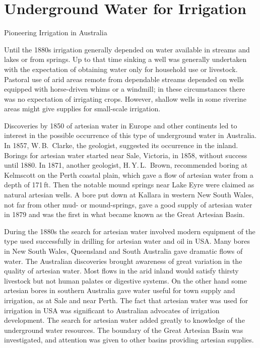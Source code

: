 
\setcounter{endnote}{0}

\chapter{Underground Water for Irrigation}
\label{ch:underground}
%
{Pioneering Irrigation in Australia}

Until the 1880s irrigation generally depended on water available in
streams and lakes or from springs.  Up to that time sinking a well was
generally undertaken with the expectation of obtaining water only for
household use or livestock.  Pastoral use of arid areas remote from
dependable streams depended on wells equipped with horse-driven whims
or a windmill; in these circumstances there was no expectation of
irrigating crops.  However, shallow wells in some riverine areas might
give supplies for small-scale irrigation.

Discoveries by 1850 of artesian water in Europe and other continents
led to interest in the possible occurrence of this type of underground
water in Australia.  In 1857, W.\,B.~Clarke, the geologist, suggested
its occurrence in the inland. Borings for artesian water started near
Sale, Victoria, in 1858, without success until 1880.  In 1871, another
geologist, H.\,Y.\,L.~Brown, recommended boring at Kelmscott on the
Perth coastal plain, which gave a flow of artesian water from a depth
of 171\,ft.  Then the notable mound springs near Lake Eyre were
claimed as natural artesian wells. A bore put down at Kallara in
western New South Wales, not far from other mud- or mound-springs,
gave a good supply of artesian water in 1879 and was the first in what
became known as the Great Artesian
Basin.

During the 1880s the search for artesian water involved modern
equipment of the type used successfully in drilling for artesian water
and oil in USA.  Many bores in New South Wales, Queensland and South
Australia gave dramatic flows of water.  The Australian discoveries
brought awareness of great variation in the quality of artesian water.
Most flows in the arid inland would satisfy thirsty livestock but not
human palates or digestive systems.  On the other hand some artesian
bores in southern Australia gave water useful for town supply and
irrigation, as at Sale and near Perth.  The fact that artesian water
was used for irrigation in USA was significant to Australian advocates
of irrigation development.  The search for artesian water added
greatly to knowledge of the underground water resources.  The boundary
of the Great Artesian Basin was investigated, and attention was given
to other basins providing artesian supplies.\fn{\citet{deakin1892}.}

